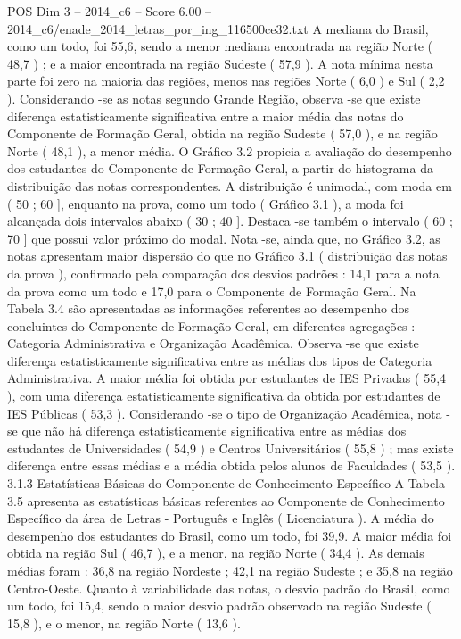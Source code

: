 \begin{textsample}{POS Dim 3 – 2014\_c6 – Score 6.00 – 2014\_c6/enade\_2014\_letras\_por\_ing\_116500ce32.txt}
A mediana do Brasil, como um todo, foi 55,6, sendo a menor mediana encontrada na região Norte ( 48,7 ) ; e a maior encontrada na região Sudeste ( 57,9 ).
A nota mínima nesta parte foi zero na maioria das regiões, menos nas regiões Norte ( 6,0 ) e Sul ( 2,2 ).
Considerando -se as notas segundo Grande Região, observa -se que existe diferença estatisticamente significativa entre a maior média das notas do Componente de Formação Geral, obtida na região Sudeste ( 57,0 ), e na região Norte ( 48,1 ), a menor média.
O Gráfico 3.2 propicia a avaliação do desempenho dos estudantes do Componente de Formação Geral, a partir do histograma da distribuição das notas correspondentes.
A distribuição é unimodal, com moda em ( 50 ; 60 ], enquanto na prova, como um todo ( Gráfico 3.1 ), a moda foi alcançada dois intervalos abaixo ( 30 ; 40 ].
Destaca -se também o intervalo ( 60 ; 70 ] que possui valor próximo do modal.
Nota -se, ainda que, no Gráfico 3.2, as notas apresentam maior dispersão do que no Gráfico 3.1 ( distribuição das notas da prova ), confirmado pela comparação dos desvios padrões : 14,1 para a nota da prova como um todo e 17,0 para o Componente de Formação Geral.
Na Tabela 3.4 são apresentadas as informações referentes ao desempenho dos concluintes do Componente de Formação Geral, em diferentes agregações : Categoria Administrativa e Organização Acadêmica.
Observa -se que existe diferença estatisticamente significativa entre as médias dos tipos de Categoria Administrativa.
A maior média foi obtida por estudantes de IES Privadas ( 55,4 ), com uma diferença estatisticamente significativa da obtida por estudantes de IES Públicas ( 53,3 ).
Considerando -se o tipo de Organização Acadêmica, nota -se que não há diferença estatisticamente significativa entre as médias dos estudantes de Universidades ( 54,9 ) e Centros Universitários ( 55,8 ) ; mas existe diferença entre essas médias e a média obtida pelos alunos de Faculdades ( 53,5 ). 3.1.3 Estatísticas Básicas do Componente de Conhecimento Específico A Tabela 3.5 apresenta as estatísticas básicas referentes ao Componente de Conhecimento Específico da área de Letras - Português e Inglês ( Licenciatura ).
A média do desempenho dos estudantes do Brasil, como um todo, foi 39,9.
A maior média foi obtida na região Sul ( 46,7 ), e a menor, na região Norte ( 34,4 ).
As demais médias foram : 36,8 na região Nordeste ; 42,1 na região Sudeste ; e 35,8 na região Centro-Oeste.
Quanto à variabilidade das notas, o desvio padrão do Brasil, como um todo, foi 15,4, sendo o maior desvio padrão observado na região Sudeste ( 15,8 ), e o menor, na região Norte ( 13,6 ).

\end{textsample}
